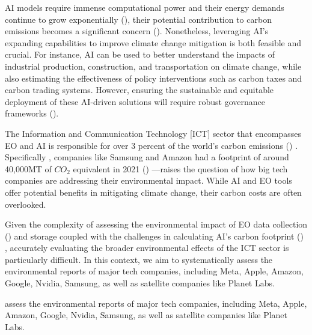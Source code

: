 \documentclass[12pt]{article}
\begin{document}
AI models require immense computational power and their energy demands continue to grow exponentially (\cite{amodei_2018}),
 their potential contribution to carbon emissions becomes a significant concern (\cite{taddeo_2021}). Nonetheless, leveraging AI’s 
 expanding capabilities to improve climate change mitigation is both feasible and crucial. 
 For instance, AI can be used to better understand the impacts of industrial production, construction, 
 and transportation on climate change, while also estimating the effectiveness of policy interventions such 
 as carbon taxes and carbon trading systems. However, ensuring the sustainable and equitable deployment of these 
 AI-driven solutions will require robust governance frameworks (\cite{taddeo_2021}).

 The  Information and Communication Technology [ICT] sector that encompasses EO and AI
is responsible for over 3 percent of the world's carbon emissions (\cite{jones_2018}) . Specifically , 
companies like Samsung and Amazon had a footprint of around 40,000MT of \(CO_2\) equivalent in 2021 (\cite{navarro_2023_the}) —raises the question 
of how big tech companies are addressing their environmental impact. While AI and EO tools offer potential benefits in 
mitigating climate change, their carbon costs are often overlooked.

Given the complexity of assessing the environmental impact of EO data collection (\cite{wilkinson_2024}) and storage coupled with the challenges in calculating AI's carbon 
footprint (\cite{Henderson_2020}) , accurately evaluating the broader environmental effects of the ICT sector is particularly difficult. In this context, we aim to systematically 
assess the environmental reports of major tech companies, including Meta, Apple, Amazon, Google, Nvidia, Samsung, as well as satellite companies like Planet Labs. 


assess the environmental reports of major tech companies, including Meta, Apple, Amazon, Google, Nvidia, Samsung, as well as satellite companies like Planet Labs.
\end{document}
